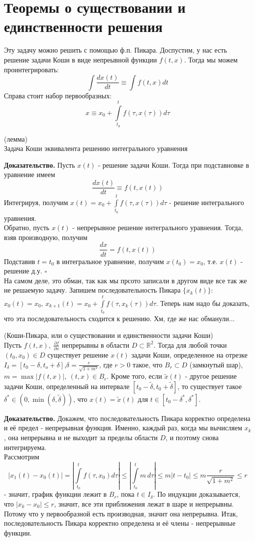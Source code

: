 \section{Теоремы о существовании и единственности решения}
Эту задачу можно решить с помощью ф.п. Пикара. Доспустим, у нас есть 
решение задачи Коши в виде непреывной функции $f(t,x)$. Тогда мы можем
проинтегрировать:
 $$\int \frac{dx(t)}{dt} \equiv \int f(t,x)dt$$ 
 Справа стоит набор первообразных:
 $$x\equiv x_0+\int\limits_{t_0}^{t}f(\tau,x(\tau))d\tau$$ 
\begin{theor} (лемма)\\
    Задача Коши эквивалента решению интегрального уравнения
\end{theor}
\textbf{Доказательство.} Пусть $x(t)$ - решение задачи Коши. Тогда
при подставновке в уравнение имеем 
$$\frac{dx(t)}{dt}\equiv f(t,x(t))$$ 
Интегрируя, получим 
$x(t)=x_0+\int\limits_{t_0}^{t}f(\tau,x(\tau))d\tau$ - решение интегрального
уравнения.\\
Обратно, пусть $x(t)$ - непрерывное решение интегрального уравнения.
Тогда, взяв производную, получим
$$\frac{dx}{dt}=f(t,x(t))$$ 
Подставив $t=t_0$ в интегральное уравнение, получим  $x(t_0)=x_0$, т.е.
$x(t)$ - решение д.у. $\square$ \\
На самом деле, это обман, так как мы прсото записали в другом виде все так 
же не решаемую задачу. Запишем последовательность Пикара $\{x_k(t)\}$:
$x_0(t)=x_0$,  $x_{k+1}(t)=x_0+\int\limits_{t_0}^{t}f(\tau,x_k(\tau))d\tau$.
Теперь нам надо бы доказать, что эта последовательность сходится к 
решению. Хм, где же нас обманули... 
\begin{theor} (Коши-Пикара, или о существовании и единственности задачи 
Коши)\\
Пусть $f(t,x),~\frac{\partial f}{\partial x}$ непрерывны в области $D\subset 
\mathbb{R}^2$. Тогда для любой точки $(t_0,x_0)\in D$ существует решение
$x(t)$ задачи Коши, определенное на отрезке $I_\delta=[t_0-\delta,t_o+\delta]$,$\delta=\frac{r}{\sqrt{1+m^2}}$, где $r>0$ такое, что  $B_r\subset D$
(замкнутый шар), $m=\max|f(t,x)|,~(t,x)\in B_r$. Кроме того, если
$\tilde x(t)$ - другое решение задачи Коши, определенный на интервале
$[t_0-\tilde\delta,t_0+\tilde\delta]$, то существует такое
$\delta^*\in (0,\min(\delta,\tilde\delta))$, что $x(t)=\tilde x(t)$ 
для $t\in [t_0-\delta^*,\delta^*]$.
\end{theor}
\textbf{Доказательство.}  Докажем, что последовательность Пикара корректно
определена и её предел - непрерывная функция. Именно, каждый раз, когда
мы вычисляем $x_k$, она непрерывна и не выходит за пределы области  $D$,
и поэтому снова интегрируема. \\
Рассмотрим $$|x_1(t)-x_0(t)|=
\left| \int\limits_{t_0}^{t}f(\tau,x_0)d\tau\right|\leqslant 
\left|\int\limits_{t_0}^{t}m\,d\tau\right|\leqslant m|t-t_0|\leqslant
m\frac{r}{\sqrt{1+m^2}}\leqslant r$$ - значит, график функции лежит в 
$B_r$, пока  $t\in I_\delta$. По индукции доказывается, что 
$|x_k-x_0|\leqslant r$, значит, все эти приближения лежат в шаре и непрерывны.
Потому что у первообразной есть производная, значит она непрерывна. 
Итак, последовательность Пикара корректно определена и её члены - непрерывные 
функции.

